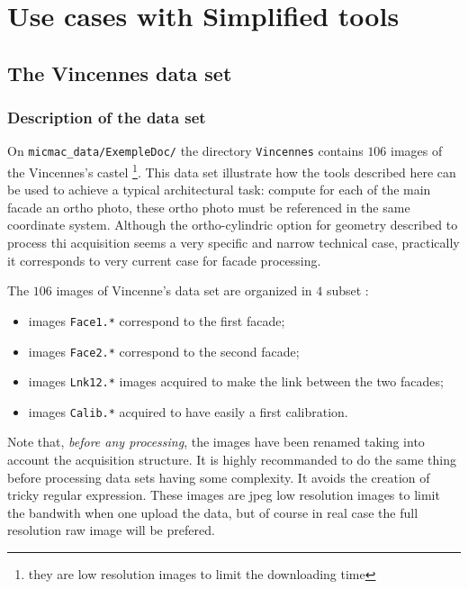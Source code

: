 \chapter{Use cases with Simplified tools}



\section{The Vincennes data set}


\subsection{Description of the data set}
\label{Vincennes:DataSet}

On {\tt micmac\_data/ExempleDoc/} the directory {\tt Vincennes} contains
$106$ images of the Vincennes's castel \footnote{they are low resolution images
to limit the  downloading time}. This data set illustrate how
the tools described here can be used to achieve a typical architectural task:
compute for each of the main facade an ortho photo, these ortho photo
must be referenced in the same coordinate system.  Although the ortho-cylindric
option for geometry described to process thi acquisition seems a very specific
and narrow technical case, practically it corresponds to very current case
for facade processing.


The $106$ images of Vincenne's data set are organized in $4$ subset :


\begin{itemize}
   \item  images {\tt Face1.*} correspond to the first facade;
   \item  images {\tt Face2.*} correspond to the second facade;
   \item  images {\tt  Lnk12.*} images acquired to make the link between
           the two facades;
   \item  images {\tt  Calib.*} acquired to have easily a first
           calibration.
\end{itemize}

Note that, \emph{before any processing}, the images have been renamed taking 
into account the acquisition structure. It is highly recommanded to do the
same thing before processing data sets having some complexity. It avoids
the creation of tricky regular expression. These images are jpeg low resolution
images to limit the bandwith when one upload the data, but of course in
real case the full resolution raw image will be prefered.


